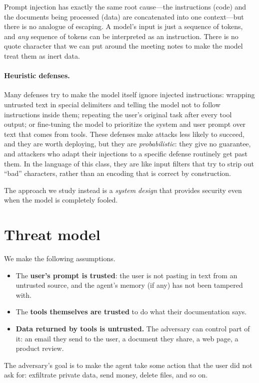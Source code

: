 Prompt injection has exactly the same root cause---the instructions
(code) and the documents being processed (data) are concatenated into one
context---but there is no analogue of escaping.
A model's input is just a sequence of tokens, and \emph{any} sequence of
tokens can be interpreted as an instruction.
There is no quote character that we can put around the meeting notes to
make the model treat them as inert data.%

\paragraph{Heuristic defenses.}
Many defenses try to make the model itself ignore injected instructions:
wrapping untrusted text in special delimiters and telling the model not
to follow instructions inside them; repeating the user's original task
after every tool output; or fine-tuning the model to prioritize the
system and user prompt over text that comes from tools.
These defenses make attacks less likely to succeed, and they are worth
deploying, but they are \emph{probabilistic}: they give no guarantee,
and attackers who adapt their injections to a specific defense routinely
get past them.
In the language of this class, they are like input filters that try to
strip out ``bad'' characters, rather than an encoding that is correct by
construction.

The approach we study instead is a \emph{system design} that provides
security even when the model is completely fooled.

\section{Threat model}
\label{sec:camel:threat}

We make the following assumptions.
\begin{itemize}
  \item The \textbf{user's prompt is trusted}: the user is not pasting
    in text from an untrusted source, and the agent's memory (if any) has
    not been tampered with.
  \item The \textbf{tools themselves are trusted} to do what their
    documentation says.
  \item \textbf{Data returned by tools is untrusted.} The adversary can
    control part of it: an email they send to the user, a document they
    share, a web page, a product review.
\end{itemize}
The adversary's goal is to make the agent take some action that the
user did not ask for: exfiltrate private data, send money, delete files,
and so on.

